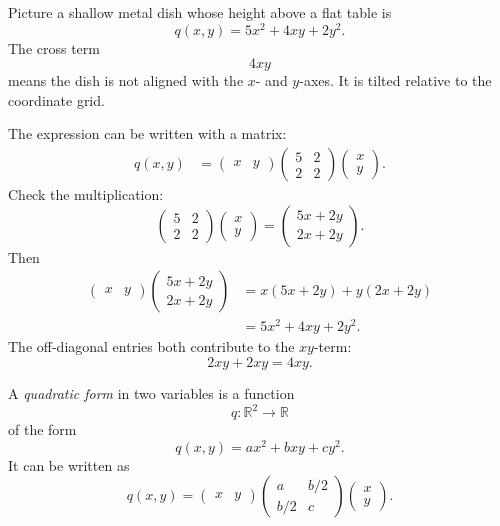Picture a shallow metal dish whose height above a flat table is
\[
    q(x,y)=5x^2+4xy+2y^2.
\]
The cross term
\[
    4xy
\]
means the dish is not aligned with the \(x\)- and \(y\)-axes.  It is tilted relative to
the coordinate grid.

The expression can be written with a matrix:
\[
\begin{aligned}
    q(x,y)
    &=
    \begin{pmatrix}x&y\end{pmatrix}
    \begin{pmatrix}
        5&2\\
        2&2
    \end{pmatrix}
    \begin{pmatrix}
        x\\y
    \end{pmatrix}.
\end{aligned}
\]
Check the multiplication:
\[
    \begin{pmatrix}
        5&2\\
        2&2
    \end{pmatrix}
    \begin{pmatrix}
        x\\y
    \end{pmatrix}
    =
    \begin{pmatrix}
        5x+2y\\
        2x+2y
    \end{pmatrix}.
\]
Then
\[
\begin{aligned}
    \begin{pmatrix}x&y\end{pmatrix}
    \begin{pmatrix}
        5x+2y\\
        2x+2y
    \end{pmatrix}
    &=
    x(5x+2y)+y(2x+2y)\\
    &=
    5x^2+4xy+2y^2.
\end{aligned}
\]
The off-diagonal entries both contribute to the \(xy\)-term:
\[
    2xy+2xy=4xy.
\]

\begin{definition}
A \emph{quadratic form} in two variables is a function
\[
    q:\mathbb R^2\to\mathbb R
\]
of the form
\[
    q(x,y)=ax^2+bxy+cy^2.
\]
It can be written as
\[
\boxed{
    q(x,y)
    =
    \begin{pmatrix}x&y\end{pmatrix}
    \begin{pmatrix}
        a&b/2\\
        b/2&c
    \end{pmatrix}
    \begin{pmatrix}
        x\\y
    \end{pmatrix}.
}
\]
\end{definition}

